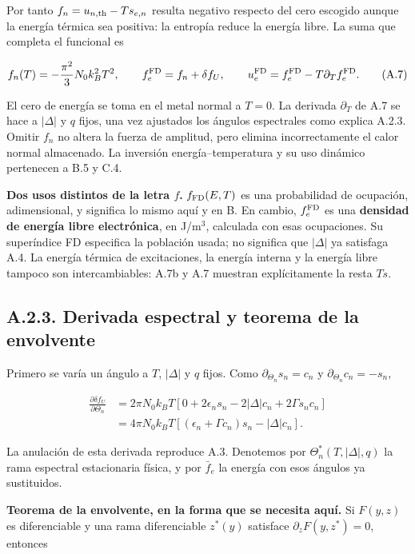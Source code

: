 \documentclass[
  spanish,
  10pt,
  a4paper,
]{article}
\begin{document}
Por tanto \(f_n=u_{n,\rm th}-Ts_{e,n}\) resulta negativo respecto del
cero escogido aunque la energía térmica sea positiva: la entropía reduce
la energía libre. La suma que completa el funcional es

\[
f_n(T)=-\frac{\pi^2}{3}N_0 k_B^2T^2,
\qquad f_e^{\rm FD}=f_n+\delta f_U,
\qquad u_e^{\rm FD}=f_e^{\rm FD}-T\partial_Tf_e^{\rm FD}.
\tag{A.7}
\]

El cero de energía se toma en el metal normal a \(T=0\). La derivada
\(\partial_T\) de A.7 se hace a \(|\Delta|\) y \(q\) fijos, una vez
ajustados los ángulos espectrales como explica A.2.3. Omitir \(f_n\) no
altera la fuerza de amplitud, pero elimina incorrectamente el calor
normal almacenado. La inversión energía--temperatura y su uso dinámico
pertenecen a B.5 y C.4.

\textbf{Dos usos distintos de la letra \(f\).} \(f_{\rm FD}(E,T)\) es
una probabilidad de ocupación, adimensional, y significa lo mismo aquí y
en B. En cambio, \(f_e^{\rm FD}\) es una \textbf{densidad de energía
libre electrónica}, en J/m\(^3\), calculada con esas ocupaciones. Su
superíndice FD especifica la población usada; no significa que
\(|\Delta|\) ya satisfaga A.4. La energía térmica de excitaciones, la
energía interna y la energía libre tampoco son intercambiables: A.7b y
A.7 muestran explícitamente la resta \(Ts\).

\subsection{A.2.3. Derivada espectral y teorema de la
envolvente}\label{a.2.3.-derivada-espectral-y-teorema-de-la-envolvente}

Primero se varía un ángulo a \(T\), \(|\Delta|\) y \(q\) fijos. Como
\(\partial_{\Theta_n}s_n=c_n\) y \(\partial_{\Theta_n}c_n=-s_n\),

\[
\begin{aligned}
\frac{\partial\delta f_U}{\partial\Theta_n}
&=2\pi N_0k_BT\left[0+2\epsilon_ns_n-2|\Delta|c_n
+2\Gamma s_nc_n\right]\\
&=4\pi N_0k_BT\left[(\epsilon_n+\Gamma c_n)s_n-|\Delta|c_n\right].
\end{aligned}
\tag{A.8a}
\]

La anulación de esta derivada reproduce A.3. Denotemos por
\(\Theta_n^*(T,|\Delta|,q)\) la rama espectral estacionaria física, y
por \(\bar f_e\) la energía con esos ángulos ya sustituidos.

\textbf{Teorema de la envolvente, en la forma que se necesita aquí.} Si
\(F(y,z)\) es diferenciable y una rama diferenciable \(z^*(y)\)
satisface \(\partial_zF(y,z^*)=0\), entonces
\end{document}
